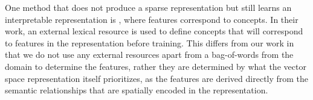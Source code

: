 One method that does not produce a sparse representation but still learns an interpretable representation is \cite{Koc}, where features correspond to concepts. In their work, an external lexical resource is used to define  concepts that will correspond to features in the representation before training. This differs from our work in that we do not use any external resources apart from a bag-of-words from the domain to determine the features, rather they are determined by what the vector space representation itself prioritizes, as the features are derived directly from the semantic relationships that are spatially encoded in the representation. 















